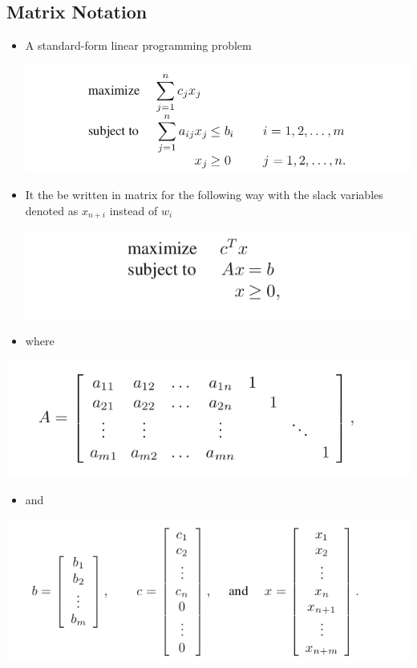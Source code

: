 \documentclass[11pt]{article}
\begin{document}
\subsection{Matrix Notation}
\label{sec:orgaf37900}
\begin{itemize}
\item A standard-form linear programming problem
\begin{center}
\includegraphics[width=.9\linewidth]{The Simplex Method in Matrix Notation/screenshot_2019-02-11_15-56-17.png}
\end{center}
\item It the be written in matrix for the following way with the slack variables denoted as \(x_{n+i}\) instead of \(w_i\)  
\begin{center}
\includegraphics[width=.9\linewidth]{The Simplex Method in Matrix Notation/screenshot_2019-02-11_15-57-54.png}
\end{center}
\item where
\end{itemize}
\begin{center}
\includegraphics[width=.9\linewidth]{The Simplex Method in Matrix Notation/screenshot_2019-02-11_15-58-09.png}
\end{center}
\begin{itemize}
\item and
\end{itemize}
\begin{center}
\includegraphics[width=.9\linewidth]{The Simplex Method in Matrix Notation/screenshot_2019-02-11_15-59-28.png}
\end{center}
\end{document}

